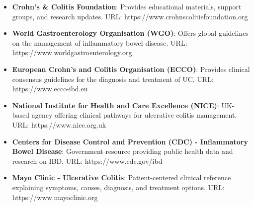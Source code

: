 \begin{itemize}
  \item \textbf{Crohn's \& Colitis Foundation}: Provides educational materials, support groups, and research updates. URL: https://www.crohnscolitisfoundation.org
  \item \textbf{World Gastroenterology Organisation (WGO)}: Offers global guidelines on the management of inflammatory bowel disease. URL: https://www.worldgastroenterology.org
  \item \textbf{European Crohn's and Colitis Organisation (ECCO)}: Provides clinical consensus guidelines for the diagnosis and treatment of UC. URL: https://www.ecco-ibd.eu
  \item \textbf{National Institute for Health and Care Excellence (NICE)}: UK-based agency offering clinical pathways for ulcerative colitis management. URL: https://www.nice.org.uk
  \item \textbf{Centers for Disease Control and Prevention (CDC) - Inflammatory Bowel Disease}: Government resource providing public health data and research on IBD. URL: https://www.cdc.gov/ibd
  \item \textbf{Mayo Clinic - Ulcerative Colitis}: Patient-centered clinical reference explaining symptoms, causes, diagnosis, and treatment options. URL: https://www.mayoclinic.org
\end{itemize}